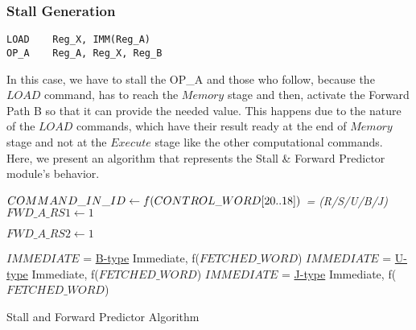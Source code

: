 \subsubsection{Stall Generation}
\begin{lstlisting}[caption={Stall Scenario},captionpos=b]
LOAD 	Reg_X, IMM(Reg_A)
OP_A	Reg_A, Reg_X, Reg_B
\end{lstlisting}

In this case, we have to stall the OP\_A and those who follow, because the $LOAD$ command, has to reach the $Memory$ stage and then, activate the Forward Path B so that it can provide the needed value. This happens due to the nature of the $LOAD$ commands, which have their result ready at the end of $Memory$ stage and not at the $Execute$ stage like the other computational commands.\\

Here, we present an algorithm that represents the Stall \& Forward Predictor module's behavior. 

\begin{algorithm}[H]
	\SetAlgoLined
	
	\BlankLine
	\BlankLine
	
	\emph{{\small $COMMAND\_IN\_ID \leftarrow f({\scriptsize CONTROL\_WORD[20..18]})$} {\footnotesize= (R/S/U/B/J)}} \;
	\BlankLine
	 { \small $FWD\_A\_RS1 \leftarrow 1$\;}
	
	 { \small $FWD\_A\_RS2 \leftarrow 1$\;}
	
	
	 { {\small $IMMEDIATE$ =  \underline{B-type} Immediate, f(\footnotesize{$FETCHED\_WORD$})} \;}
	 { {\small $IMMEDIATE$ =  \underline{U-type} Immediate, f(\footnotesize{$FETCHED\_WORD$})} \;}
	 { {\small $IMMEDIATE$ =  \underline{J-type} Immediate, f(\footnotesize{$FETCHED\_WORD$})} \;}
	
	\caption{Stall and Forward Predictor Algorithm}
\end{algorithm}	
